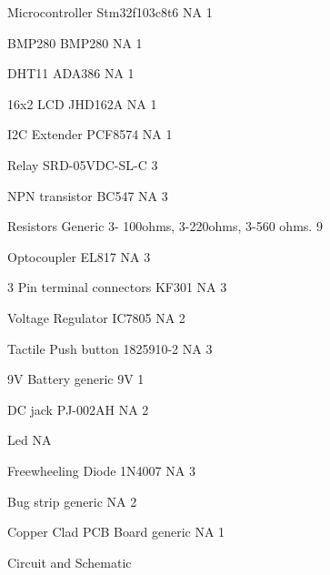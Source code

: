 \begin{DoxyEnumerate}
\item Microcontroller Stm32f103c8t6 NA 1 ~\newline

\item BMP280 BMP280 NA 1 ~\newline

\item DHT11 ADA386 NA 1 ~\newline

\item 16x2 LCD JHD162A NA 1 ~\newline

\item I2C Extender PCF8574 NA 1 ~\newline

\item Relay SRD-\/05\+VDC-\/\+SL-\/C 3 ~\newline

\item NPN transistor BC547 NA 3 ~\newline

\item Resistors Generic 3-\/ 100ohms, 3-\/220ohms, 3-\/560 ohms. 9 ~\newline

\item Optocoupler EL817 NA 3 ~\newline

\item 3 Pin terminal connectors KF301 NA 3 ~\newline

\item Voltage Regulator IC7805 NA 2 ~\newline

\item Tactile Push button 1825910-\/2 NA 3 ~\newline

\item 9V Battery generic 9V 1 ~\newline

\item DC jack PJ-\/002\+AH NA 2 ~\newline

\item Led NA ~\newline

\item Freewheeling Diode 1N4007 NA 3 ~\newline

\item Bug strip generic NA 2 ~\newline

\item Copper Clad PCB Board generic NA 1 ~\newline

\begin{DoxyEnumerate}
\item Circuit and Schematic ~\newline

\end{DoxyEnumerate}
\end{DoxyEnumerate}



 